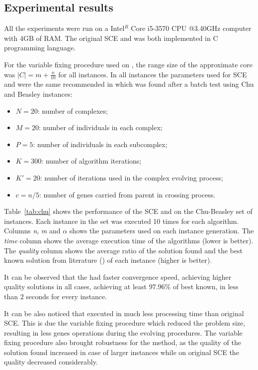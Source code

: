 \subsection{Experimental results}

All the experiments were run on a Intel$^R$ Core i5-3570 CPU @3.40GHz computer
with 4GB of RAM.
The original SCE and \scecore was both implemented in C programming language.

For the variable fixing procedure used on \scecore, the range size of the approximate core was
$|C| = m+\frac{n}{10}$ for all instances.
In all instances the parameters used for SCE and \scecore were the same recommended
in \cite{baroni2015shuffled} which was found after a batch test using Chu and Beasley instances:
\begin{itemize}
  \item $N = 20$: number of complexes;
  \item $M = 20$: number of individuals in each complex;
  \item $P = 5$: number of individuals in each subcomplex;
  \item $K = 300$: number of algorithm iterations;
  \item $K' = 20$: number of iterations used in the complex evolving process;
  \item $c = n/5$: number of genes carried from parent in crossing process.
\end{itemize}

Table~\ref{tab:chu} shows the performance of the SCE and \scecore on the Chu-Beasley set of instances.
Each instance in the set was executed 10 times for each algorithm.
Columns \textit{n}, \textit{m} and \textit{$\alpha$} shows the parameters used
on each instance generation.
The \textit{time} column shows the average execution time of the algorithms (lower is better).
The \textit{quality} column shows the average ratio of the solution found and
the best known solution from literature (\cite{vimont2008reduced, della2012improved}) of each instance (higher is better).

It can be observed that the \scecore had faster convergence speed, achieving higher
quality solutions in all cases, achieving at least $97.96\%$ of best known, in less than $2$ seconds
for every instance.

It can be also noticed that \scecore executed in much less processing time than original
SCE.
This is due the variable fixing procedure which reduced the problem size,
resulting in less genes operations during the evolving procedures.
The variable fixing procedure also brought robustness for the method, as the quality
of the solution found increased in case of larger instances while on original
SCE the quality decreased considerably.

